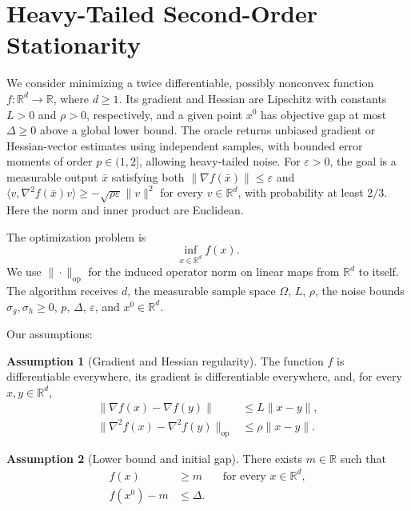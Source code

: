 \documentclass[10pt]{article}
\theoremstyle{definition}
\newtheorem{assumption}{Assumption}
\begin{document}
\section*{Heavy-Tailed Second-Order Stationarity}
We consider minimizing a twice differentiable, possibly nonconvex function $f:\mathbb{R}^d\to\mathbb{R}$, where $d\geq1$. Its gradient and Hessian are Lipschitz with constants $L>0$ and $\rho>0$, respectively, and a given point $x^0$ has objective gap at most $\Delta\geq0$ above a global lower bound. The oracle returns unbiased gradient or Hessian-vector estimates using independent samples, with bounded error moments of order $p\in(1,2]$, allowing heavy-tailed noise. For $\varepsilon>0$, the goal is a measurable output $\bar{x}$ satisfying both $\|\nabla f(\bar{x})\|\leq\varepsilon$ and $\langle v,\nabla^2 f(\bar{x})v\rangle\geq-\sqrt{\rho\varepsilon}\|v\|^2$ for every $v\in\mathbb{R}^d$, with probability at least $2/3$. Here the norm and inner product are Euclidean.

The optimization problem is
\[
\inf_{x\in\mathbb{R}^d} f(x).
\]
We use $\|\cdot\|_{\mathrm{op}}$ for the induced operator norm on linear maps from $\mathbb{R}^d$ to itself. The algorithm receives $d$, the measurable sample space $\Omega$, $L$, $\rho$, the noise bounds $\sigma_g,\sigma_h\geq0$, $p$, $\Delta$, $\varepsilon$, and $x^0\in\mathbb{R}^d$.

Our assumptions:
\begin{assumption}[Gradient and Hessian regularity]
The function $f$ is differentiable everywhere, its gradient is differentiable everywhere, and, for every $x,y\in\mathbb{R}^d$,
\[
\begin{aligned}
\|\nabla f(x)-\nabla f(y)\|&\leq L\|x-y\|,\\
\|\nabla^2 f(x)-\nabla^2 f(y)\|_{\mathrm{op}}&\leq\rho\|x-y\|.
\end{aligned}
\]
\end{assumption}

\begin{assumption}[Lower bound and initial gap]
There exists $m\in\mathbb{R}$ such that
\[
\begin{aligned}
f(x)&\geq m &&\text{for every }x\in\mathbb{R}^d,\\
f(x^0)-m&\leq\Delta.
\end{aligned}
\]
\end{assumption}
\end{document}

